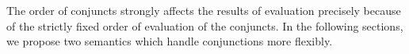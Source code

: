 The order of conjuncts strongly affects the results of evaluation precisely because of the strictly fixed order of evaluation of the conjuncts. In the following sections,
we propose two semantics which handle conjunctions more flexibly.
